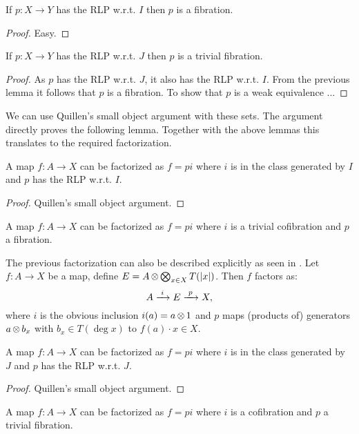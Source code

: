 \begin{lemma}
	If $p: X \to Y$ has the RLP w.r.t. $I$ then $p$ is a fibration.
\end{lemma}
\begin{proof}
	Easy.
\end{proof}

\begin{lemma}
	If $p: X \to Y$ has the RLP w.r.t. $J$ then $p$ is a trivial fibration.
\end{lemma}
\begin{proof}
	As $p$ has the RLP w.r.t. $J$, it also has the RLP w.r.t. $I$. From the previous lemma it follows that $p$ is a fibration. To show that $p$ is a weak equivalence ... 
\end{proof}

We can use Quillen's small object argument with these sets. The argument directly proves the following lemma. Together with the above lemmas this translates to the required factorization.

\begin{lemma}
	A map $f: A \to X$ can be factorized as $f = pi$ where $i$ is in the class generated by $I$ and $p$ has the RLP w.r.t. $I$.
\end{lemma}
\begin{proof}
	Quillen's small object argument. 
\end{proof}

\begin{corollary}
	[MC5a] A map $f: A \to X$ can be factorized as $f = pi$ where $i$ is a trivial cofibration and $p$ a fibration.
\end{corollary}

The previous factorization can also be described explicitly as seen in \cite{bous}. Let $f: A \to X$ be a map, define $E = A \operatorname*{\otimes} \operatorname*{\bigotimes}_{x \in X}T({|{x}|})$. Then $f$ factors as:
$$ A \xrightarrow{\,\,{i}\,\,} E \xrightarrow{\,\,{p}\,\,} X, $$
where $i$ is the obvious inclusion $i(a) = a \operatorname*{\otimes} 1$ and $p$ maps (products of) generators $a \operatorname*{\otimes} b_x$ with $b_x \in T(\deg{x})$ to $f(a) \cdot x \in X$.

\begin{lemma}
	A map $f: A \to X$ can be factorized as $f = pi$ where $i$ is in the class generated by $J$ and $p$ has the RLP w.r.t. $J$.
\end{lemma}
\begin{proof}
	Quillen's small object argument.
\end{proof}

\begin{corollary}
	[MC5b] A map $f: A \to X$ can be factorized as $f = pi$ where $i$ is a cofibration and $p$ a trivial fibration.
\end{corollary}


